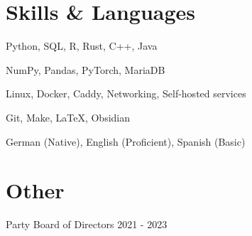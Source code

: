 \documentclass[11pt]{article}
\begin{document}
\section{Skills \& Languages}
\begin{description}[itemsep=0pt]
	\item[Programming] Python, SQL, R, Rust, C++, Java
	\item[Data \& ML] NumPy, Pandas, PyTorch, MariaDB
	\item[Infrastructure] Linux, Docker, Caddy, Networking, Self-hosted services
	\item[Tools] Git, Make, \LaTeX, Obsidian
	\item[Languages] German (Native), English (Proficient), Spanish (Basic)
\end{description}

\section{Other}
\begin{description}[itemsep=0pt]
	\item[Die PARTEI] Party Board of Directors \hfill 2021 - 2023
\end{description}
\end{document}
